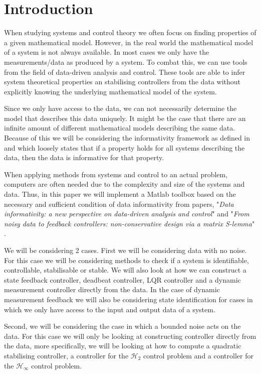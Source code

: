 
\section{Introduction}
When studying systems and control theory we often focus on finding properties of a given mathematical model. However, in the real world the mathematical model of a system is not always available. In most cases we only have the measurements/data as produced by a system. To combat this, we can use tools from the field of data-driven analysis and control. These tools are able to infer system theoretical properties an stabilising controllers from the data without explicitly knowing the underlying mathematical model of the system.

Since we only have access to the data, we can not necessarily determine the model that describes this data uniquely. 
It might be the case that there are an infinite amount of different mathematical models describing the same data.
Because of this we will be considering the informativity framework as defined in \cite{waarde2019data} and \cite{waarde2020noisy} which loosely states that if a property holds for all systems describing the data, then the data is informative for that property.

When applying methods from systems and control to an actual problem, computers are often needed due to the complexity and size of the systems and data. Thus, in this paper we will implement a Matlab toolbox based on the necessary and sufficient condition of data informativity from papers, "\textit{Data informativity: a new perspective on data-driven analysis and control}" \cite{waarde2019data} and "\textit{From noisy data to feedback controllers: non-conservative design via a matrix S-lemma}" \cite{waarde2020noisy}. 

We will be considering 2 cases. First we will be considering data with no noise. For this case we will be considering methods to check if a system is identifiable, controllable, stabilisable or stable. We will also look at how we can construct a state feedback controller, deadbeat controller, LQR controller and a dynamic measurement controller directly from the data. In the case of dynamic measurement feedback we will also be considering state identification for cases in which we only have access to the input and output data of a system.

Second, we will be considering the case in which a bounded noise acts on the data. For this case we will only be looking at constructing controller directly from the data, more specifically, we will be looking at how to compute a quadratic stabilising controller, a controller for the $\mathcal{H}_2$ control problem and a controller for the $\mathcal{H}_\infty$ control problem.